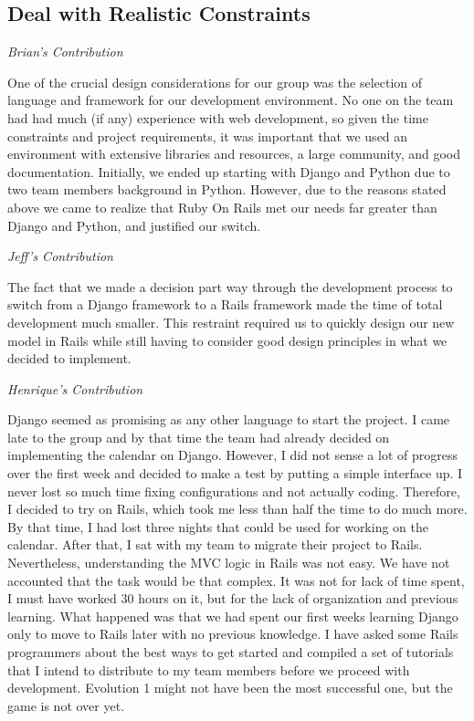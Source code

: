 \documentclass[11pt]{article}
\begin{document}
\subsection{Deal with Realistic Constraints}

\textit{Brian's Contribution}

One of the crucial design considerations for our group was the selection of language and framework for our development environment. No one on the team had had much (if any) experience with web development, so given the time constraints and project requirements, it was important that we used an environment with extensive libraries and resources, a large community, and good documentation. Initially, we ended up starting with Django and Python due to two team members background in Python. However, due to the reasons stated above we came to realize that Ruby On Rails met our needs far greater than Django and Python, and justified our switch. 

\textit{Jeff's Contribution}

The fact that we made a decision part way through the development process to switch from a Django framework to a Rails framework made the time of total development much smaller.  This restraint required us to quickly design our new model in Rails while still having to consider good design principles in what we decided to implement.

\textit{Henrique's Contribution}

Django seemed as promising as any other language to start the project. I came late to the group and by that time the team had already decided on implementing the calendar on Django. However, I did not sense a lot of progress over the first week and decided to make a test by putting a simple interface up. I never lost so much time fixing configurations and not actually coding. Therefore, I decided to try on Rails, which took me less than half the time to do much more. By that time, I had lost three nights that could be used for working on the calendar. After that, I sat with my team to migrate their project to Rails. Nevertheless, understanding the MVC logic in Rails was not easy. We have not accounted that the task would be that complex. It was not for lack of time spent, I must have worked 30 hours on it, but for the lack of organization and previous learning. What happened was that we had spent our first weeks learning Django only to move to Rails later with no previous knowledge. I have asked some Rails programmers about the best ways to get started and compiled a set of tutorials that I intend to distribute to my team members before we proceed with development. Evolution 1 might not have been the most successful one, but the game is not over yet.
\end{document}

